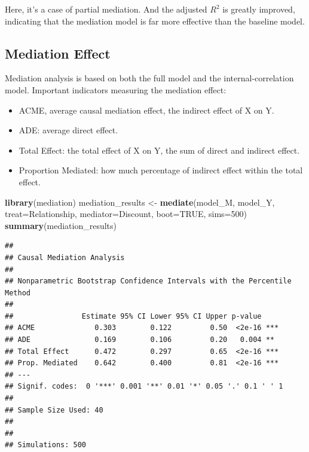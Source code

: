 \documentclass[
]{ctexart}
\newenvironment{Shaded}{\begin{snugshade}}{\end{snugshade}}
\newcommand{\AttributeTok}[1]{\textcolor[rgb]{0.13,0.29,0.53}{#1}}
\newcommand{\ConstantTok}[1]{\textcolor[rgb]{0.56,0.35,0.01}{#1}}
\newcommand{\DecValTok}[1]{\textcolor[rgb]{0.00,0.00,0.81}{#1}}
\newcommand{\FunctionTok}[1]{\textcolor[rgb]{0.13,0.29,0.53}{\textbf{#1}}}
\newcommand{\NormalTok}[1]{#1}
\newcommand{\OtherTok}[1]{\textcolor[rgb]{0.56,0.35,0.01}{#1}}
\newcommand{\StringTok}[1]{\textcolor[rgb]{0.31,0.60,0.02}{#1}}
\providecommand{\tightlist}{%
  \setlength{\itemsep}{0pt}\setlength{\parskip}{0pt}}
\begin{document}
Here, it's a case of partial mediation. And the adjusted \(R^2\) is
greatly improved, indicating that the mediation model is far more
effective than the baseline model.

\hypertarget{mediation-effect}{%
\subsection{Mediation Effect}\label{mediation-effect}}

Mediation analysis is based on both the full model and the
internal-correlation model. Important indicators measuring the mediation
effect:

\begin{itemize}
\tightlist
\item
  ACME, average causal mediation effect, the indirect effect of X on Y.
\item
  ADE: average direct effect.
\item
  Total Effect: the total effect of X on Y, the sum of direct and
  indirect effect.
\item
  Proportion Mediated: how much percentage of indirect effect within the
  total effect.
\end{itemize}

\begin{Shaded}
\begin{Highlighting}[]
\FunctionTok{library}\NormalTok{(mediation)}
\NormalTok{mediation\_results }\OtherTok{\textless{}{-}} \FunctionTok{mediate}\NormalTok{(model\_M, model\_Y, }
                             \AttributeTok{treat=}\StringTok{\textquotesingle{}Relationship\textquotesingle{}}\NormalTok{, }
                             \AttributeTok{mediator=}\StringTok{\textquotesingle{}Discount\textquotesingle{}}\NormalTok{,}
                             \AttributeTok{boot=}\ConstantTok{TRUE}\NormalTok{, }\AttributeTok{sims=}\DecValTok{500}\NormalTok{)}
\FunctionTok{summary}\NormalTok{(mediation\_results)}
\end{Highlighting}
\end{Shaded}

\begin{verbatim}
## 
## Causal Mediation Analysis 
## 
## Nonparametric Bootstrap Confidence Intervals with the Percentile Method
## 
##                Estimate 95% CI Lower 95% CI Upper p-value    
## ACME              0.303        0.122         0.50  <2e-16 ***
## ADE               0.169        0.106         0.20   0.004 ** 
## Total Effect      0.472        0.297         0.65  <2e-16 ***
## Prop. Mediated    0.642        0.400         0.81  <2e-16 ***
## ---
## Signif. codes:  0 '***' 0.001 '**' 0.01 '*' 0.05 '.' 0.1 ' ' 1
## 
## Sample Size Used: 40 
## 
## 
## Simulations: 500
\end{verbatim}
\end{document}
